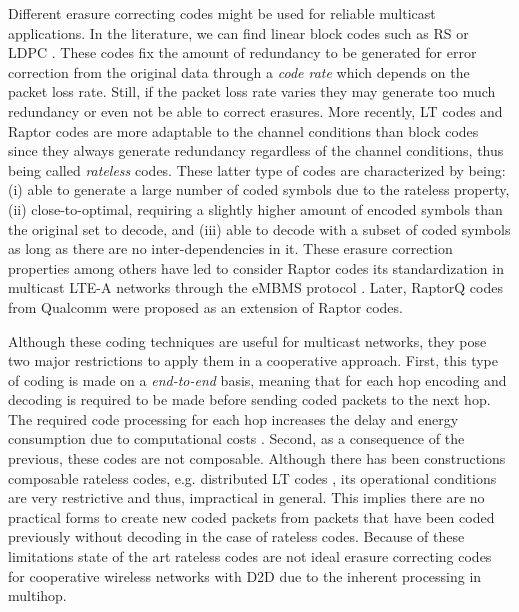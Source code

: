 Different erasure correcting codes might be used for reliable multicast applications. In the literature, we can find linear block codes such as \ac{RS} \cite{reed1960polynomial} or \ac{LDPC} \cite{gallager1962low}. These codes fix the amount of redundancy to be generated for error correction from the original data through a \textit{code rate} which depends on the packet loss rate. Still, if the packet loss rate varies they may generate too much redundancy or even not be able to correct erasures. More recently, \ac{LT} codes \cite{luby2002lt} and Raptor codes \cite{shokrollahi2006raptor} are more adaptable to the channel conditions than block codes since they always generate redundancy regardless of the channel conditions, thus being called \textit{rateless} codes. These latter type of codes are characterized by being: (i) able to generate a large number of coded symbols due to the rateless property, (ii) close-to-optimal, requiring a slightly higher amount of encoded symbols than the original set to decode, and (iii) able to decode with a subset of coded symbols as long as there are no inter-dependencies in it. These erasure correction properties among others have led to consider Raptor codes its standardization in multicast \ac{LTE-A} networks through the \ac{eMBMS} protocol \cite{embms2011general}. Later, RaptorQ codes from Qualcomm \cite{qualcomm2011raptorq} were proposed as an extension of Raptor codes.

Although these coding techniques are useful for multicast networks, they pose two major restrictions to apply them in a cooperative approach. First, this type of coding is made on a \textit{end-to-end} basis, meaning that for each hop encoding and decoding is required to be made before sending coded packets to the next hop. The required code processing for each hop increases the delay and energy consumption due to computational costs \cite{toemoeskoezi2015packet}. Second, as a consequence of the previous, these codes are not composable. Although there has been constructions composable rateless codes, e.g. distributed \ac{LT} codes \cite{puducheri2006distributed}, its operational conditions are very restrictive and thus, impractical in general. This implies there are no practical forms to create new coded packets from packets that have been coded previously without decoding in the case of rateless codes. Because of these limitations state of the art rateless codes are not ideal erasure correcting codes for cooperative wireless networks with \ac{D2D} due to the inherent processing in multihop.

